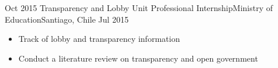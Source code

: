 \begin{experiences}
  \emptySeparator 
  \experience 
    {Oct 2015} {Transparency and Lobby Unit Professional Internship}{Ministry of Education}{Santiago, Chile} {Jul 2015}
    {\begin{itemize}
    \item Track of lobby and transparency information
    \item Conduct a literature review on transparency and open government
    \end{itemize}}
    {}
\end{experiences}
\vspace{-2mm}